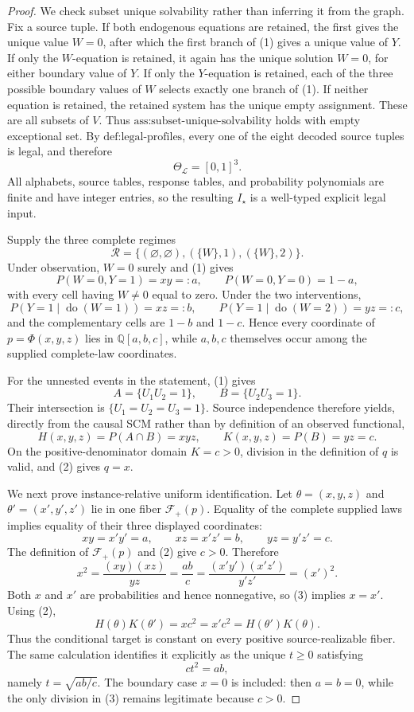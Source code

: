 \documentclass{article}
\begin{document}
\begin{proof}
We check subset unique solvability rather than inferring it from the graph.  Fix a source tuple.  If both endogenous equations are retained, the first gives the unique value \(W=0\), after which the first branch of (1) gives a unique value of \(Y\).  If only the \(W\)-equation is retained, it again has the unique solution \(W=0\), for either boundary value of \(Y\).  If only the \(Y\)-equation is retained, each of the three possible boundary values of \(W\) selects exactly one branch of (1).  If neither equation is retained, the retained system has the unique empty assignment.  These are all subsets of \(V\).  Thus \(\text{ass:subset-unique-solvability}\) holds with empty exceptional set.  By \(\text{def:legal-profiles}\), every one of the eight decoded source tuples is legal, and therefore
\[
 \Theta_{\mathcal L}=[0,1]^3.
\]
All alphabets, source tables, response tables, and probability polynomials are finite and have integer entries, so the resulting \(I_\star\) is a well-typed explicit legal input.

Supply the three complete regimes
\[
 \mathcal R=\bigl\{(\varnothing,\varnothing),
 (\{W\},1),(\{W\},2)\bigr\}.
\]
Under observation, \(W=0\) surely and (1) gives
\[
 P(W=0,Y=1)=xy=:a,
 \qquad P(W=0,Y=0)=1-a,
\]
with every cell having \(W\neq0\) equal to zero.  Under the two interventions,
\[
 P(Y=1\mid\operatorname{do}(W=1))=xz=:b,
 \qquad
 P(Y=1\mid\operatorname{do}(W=2))=yz=:c,
\]
and the complementary cells are \(1-b\) and \(1-c\).  Hence every coordinate of \(p=\Phi(x,y,z)\) lies in \(\mathbb Q[a,b,c]\), while \(a,b,c\) themselves occur among the supplied complete-law coordinates.

For the unnested events in the statement, (1) gives
\[
 A=\{U_1U_2=1\},\qquad B=\{U_2U_3=1\}.
\]
Their intersection is \(\{U_1=U_2=U_3=1\}\).  Source independence therefore yields, directly from the causal SCM rather than by definition of an observed functional,
\[
 H(x,y,z)=P(A\cap B)=xyz,
 \qquad
 K(x,y,z)=P(B)=yz=c.
 \tag{2}
\]
On the positive-denominator domain \(K=c>0\), division in the definition of \(q\) is valid, and (2) gives \(q=x\).

We next prove instance-relative uniform identification.  Let \(\theta=(x,y,z)\) and \(\theta'=(x',y',z')\) lie in one fiber \(\mathcal F_+(p)\).  Equality of the complete supplied laws implies equality of their three displayed coordinates:
\[
 xy=x'y'=a,\qquad xz=x'z'=b,
 \qquad yz=y'z'=c.
\]
The definition of \(\mathcal F_+(p)\) and (2) give \(c>0\).  Therefore
\[
 x^2=\frac{(xy)(xz)}{yz}=\frac{ab}{c}
 =\frac{(x'y')(x'z')}{y'z'}=(x')^2.
 \tag{3}
\]
Both \(x\) and \(x'\) are probabilities and hence nonnegative, so (3) implies \(x=x'\).  Using (2),
\[
 H(\theta)K(\theta')=x c^2=x'c^2
 =H(\theta')K(\theta).
\]
Thus the conditional target is constant on every positive source-realizable fiber.  The same calculation identifies it explicitly as the unique \(t\geq0\) satisfying
\[
 c t^2=ab,
\]
namely \(t=\sqrt{ab/c}\).  The boundary case \(x=0\) is included: then \(a=b=0\), while the only division in (3) remains legitimate because \(c>0\).


\end{proof}
\end{document}
